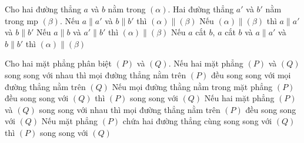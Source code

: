 \begin{ex}%
	Cho hai đường thẳng $a$ và $b$ nằm trong $(\alpha)$. Hai đường thẳng $a'$ và  $b'$ nằm trong mp $(\beta)$.
	\choiceTF 
		{Nếu $a\parallel a'$ và $b\parallel  b'$ thì $(\alpha)\parallel(\beta)$}
		{Nếu $(\alpha)\parallel(\beta)$ thì $a\parallel  a'$ và $b\parallel b'$}
		{Nếu $a\parallel b$ và $a'\parallel b'$  thì $(\alpha)\parallel(\beta)$}
		{\True Nếu $a$ cắt $b$, $a$ cắt  $b$ và $a\parallel a'$ và $b\parallel b'$ thì $(\alpha)\parallel(\beta)$}
\end{ex}

\begin{ex}%
	Cho hai mặt  phẳng phân biệt $(P)$ và $(Q)$.
	\choiceTF 
		{Nếu hai mặt phẳng $(P)$ và $(Q)$ song song với nhau thì  mọi đường thẳng nằm trên $(P)$ đều song song với mọi đường thẳng nằm trên $(Q)$}
		{\True Nếu mọi  đường thằng nằm trong mặt phẳng $(P)$ đều song song với $(Q)$ thì $(P)$ song song với $(Q)$}
		{\True Nếu hai mặt phẳng $(P)$ và $(Q)$ song song với nhau thì mọi đường thẳng nằm trên $(P)$ đều song  song với $(Q)$}
		 {Nếu mặt phẳng $(P)$ chứa hai đường thẳng cùng song song với $(Q)$ thì $(P)$ song song với $(Q)$}
\end{ex}

